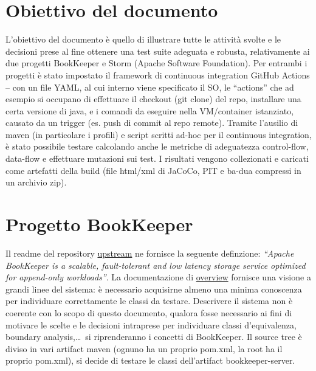 \documentclass[10pt, a4paper]{article}
\title{\reporttitle}
\author{\authorsname\;(\univcode)}
\date{}
\begin{document}
	\maketitle
	\thispagestyle{empty}

	\tableofcontents

	\section*{Obiettivo del documento}
	L’obiettivo del documento è quello di illustrare tutte le attività svolte e le decisioni prese al fine ottenere una test suite
	adeguata e robusta, relativamente ai due progetti BookKeeper e Storm (Apache Software Foundation). 
	Per entrambi i progetti è stato impostato il framework di continuous integration GitHub Actions – con un file YAML, 
	al cui interno viene specificato il SO, le “actions” che ad esempio si occupano di effettuare il checkout (git clone) del repo, 
	installare una certa versione di java, e i comandi da eseguire nella VM/container istanziato, causato da un trigger (es. push di
	commit al repo remote). 
	Tramite l’ausilio di maven (in particolare i profili) e script scritti ad-hoc per il continuous integration, è stato possibile
	testare calcolando anche le metriche di adeguatezza control-flow, data-flow e effettuare mutazioni sui test. 
	I risultati vengono collezionati e caricati come artefatti della build 
	(file html/xml di JaCoCo, PIT e ba-dua compressi in un archivio zip).

	\pagebreak

	\section{Progetto BookKeeper}
	Il readme del repository \href{https://github.com/apache/bookkeeper}{upstream} ne fornisce 
	la seguente definzione: \textit{“Apache BookKeeper is a scalable, 
	fault-tolerant and low latency storage service optimized for append-only workloads”}. 
	La documentazione di \href{https://bookkeeper.apache.org/archives/docs/master/bookkeeperOverview.html}{overview}
	fornisce una visione a grandi linee del sistema: 
	è necessario acquisirne almeno una minima conoscenza per individuare correttamente le classi da testare. 
	Descrivere il sistema non è coerente con lo scopo di questo documento, qualora fosse necessario ai fini 
	di motivare le scelte e le decisioni intraprese per individuare classi d’equivalenza, boundary analysis,\dots\,
	si riprenderanno i concetti di BookKeeper.
	Il source tree è diviso in vari artifact maven (ognuno ha un proprio pom.xml, la root ha il proprio pom.xml), 
	si decide di testare le classi dell'artifact bookkeeper-server. \\
	
\end{document}
